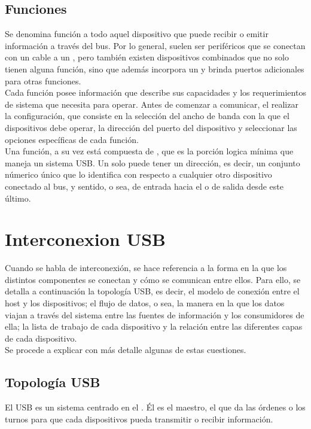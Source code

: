   \subsection{Funciones}
  Se denomina función a todo aquel dispositivo que puede recibir o emitir
  información a través del bus. Por lo general, suelen ser periféricos que se
  conectan con un cable a un \hub, pero también existen dispositivos combinados
  que no solo tienen alguna función, sino que además incorpora un \hub y brinda
  puertos adicionales para otras funciones.\\

  Cada función posee información que describe sus capacidades y los
  requerimientos de sistema que necesita para operar. Antes de comenzar a
  comunicar, el \host realizar la configuración, que consiste en la selección
  del ancho de banda con la que el dispositivos debe operar, la dirección del
  puerto del dispositivo y seleccionar las opciones específicas de cada
  función.\\

  Una función, a su vez está compuesta de \eps, que es la porción logica mínima
  que maneja un sistema USB. Un \ep solo puede tener un dirección, es decir, un
  conjunto númerico único que lo identifica con respecto a cualquier otro
  dispositivo conectado al bus, y sentido, o sea, de entrada hacia el \host o de
  salida desde este último.\\

  \section{Interconexion USB}
  Cuando se habla de interconexión, se hace referencia a la forma en la que los
  distintos componentes se conectan y cómo se comunican entre ellos. Para ello,
  se detalla a continuación la topología USB, es decir, el modelo de conexión
  entre el host y los dispositivos; el flujo de datos, o sea, la manera en la
  que los datos viajan a través del sistema entre las fuentes de información y
  los consumidores de ella; la lista de trabajo de cada dispositivo y la
  relación entre las diferentes capas de cada dispositivo.\\

  Se procede a explicar con más detalle algunas de estas cuestiones.\\

    \subsection{Topología USB}
    El USB es un sistema centrado en el \host. Él es el maestro, el que da las
    órdenes o los turnos para que cada dispositivos pueda transmitir o recibir
    información.\\

